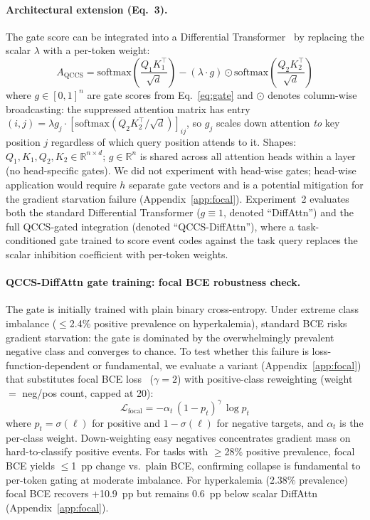 \documentclass{article}
\begin{document}
\paragraph{Architectural extension (Eq.~3).} The gate score can be integrated into a
Differential Transformer~\cite{ye2025differential} by replacing the scalar
$\lambda$ with a per-token weight:
\begin{equation}
  A_\mathrm{QCCS} = \mathrm{softmax}\!\left(\frac{Q_1 K_1^\top}{\sqrt{d}}\right)
    - (\lambda \cdot g) \odot \mathrm{softmax}\!\left(\frac{Q_2 K_2^\top}{\sqrt{d}}\right)
  \label{eq:qccs}
\end{equation}
where $g \in [0,1]^n$ are gate scores from Eq.~\ref{eq:gate} and
$\odot$ denotes column-wise broadcasting: the suppressed attention matrix has
entry $(i,j) = \lambda g_j \cdot [\mathrm{softmax}(Q_2K_2^\top/\sqrt{d})]_{ij}$,
so $g_j$ scales down attention \emph{to} key position $j$ regardless of which
query position attends to it. Shapes: $Q_1,K_1,Q_2,K_2 \in \mathbb{R}^{n \times d}$;
$g \in \mathbb{R}^n$ is shared across all attention heads within a layer (no
head-specific gates). We did not experiment with head-wise gates; head-wise
application would require $h$ separate gate vectors and is a potential mitigation
for the gradient starvation failure (Appendix~\ref{app:focal}).
Experiment~2 evaluates both the standard Differential Transformer ($g \equiv 1$,
denoted ``DiffAttn'') and the full QCCS-gated integration (denoted ``QCCS-DiffAttn''),
where a task-conditioned gate trained to score event codes against the task
query replaces the scalar inhibition coefficient with per-token weights.

\paragraph{QCCS-DiffAttn gate training: focal BCE robustness check.}
The gate is initially trained with plain binary cross-entropy. Under extreme
class imbalance ($\leq$2.4\% positive prevalence on hyperkalemia), standard BCE
risks gradient starvation: the gate is dominated by the overwhelmingly prevalent
negative class and converges to chance. To test whether this failure is
loss-function-dependent or fundamental, we evaluate a variant (Appendix~\ref{app:focal})
that substitutes focal BCE loss~\cite{lin2017focal} ($\gamma=2$) with
positive-class reweighting (weight $=$ neg/pos count, capped at 20):
\begin{equation}
  \mathcal{L}_{\mathrm{focal}} = -\alpha_t \,(1-p_t)^{\gamma}\,\log p_t
  \label{eq:focal}
\end{equation}
where $p_t = \sigma(\ell)$ for positive and $1-\sigma(\ell)$ for negative targets,
and $\alpha_t$ is the per-class weight. Down-weighting easy negatives concentrates
gradient mass on hard-to-classify positive events. For tasks with
$\geq$28\% positive prevalence, focal BCE yields $\leq$1~pp change vs.\ plain
BCE, confirming collapse is fundamental to per-token gating at moderate
imbalance. For hyperkalemia (2.38\% prevalence) focal BCE recovers +10.9~pp
but remains 0.6~pp below scalar DiffAttn (Appendix~\ref{app:focal}).
\end{document}
